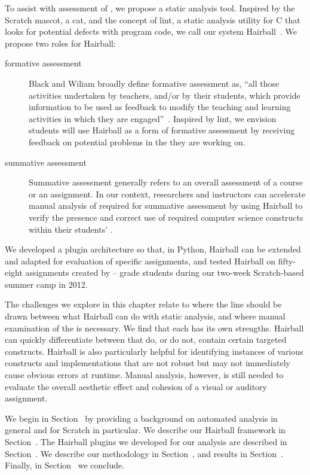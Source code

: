 To assist with assessment of , we propose a static analysis tool.
Inspired by the Scratch mascot, a cat, and the concept of lint, a static
analysis utility for C that looks for potential defects with program code, we
call our system Hairball~\cite{Johnson78lint}. We propose two roles for
Hairball:

\begin{description}
\item[formative assessment] Black and Wiliam broadly define formative
  assessment as, ``all those activities undertaken by teachers, and/or by their
  students, which provide information to be used as feedback to modify the
  teaching and learning activities in which they are
  engaged''~\cite{black1998assessment}. Inspired by lint, we envision students
  will use Hairball as a form of formative assessment by receiving feedback on
  potential problems in the  they are working on.
\item[summative assessment] Summative assessment generally refers to an overall
  assessment of a course or an assignment. In our context, researchers and
  instructors can accelerate manual analysis of  required for
  summative assessment by using Hairball to verify the presence and correct use
  of required computer science constructs within their students' .
\end{description}

We developed a plugin architecture so that, in Python, Hairball can be extended
and adapted for evaluation of specific assignments, and tested Hairball on
fifty-eight assignments created by -- grade students during our
two-week Scratch-based summer camp in 2012.

The challenges we explore in this chapter relate to where the line should be
drawn between what Hairball can do with static analysis, and where manual
examination of the \sprogram{} is necessary.  We find that each has its own
strengths.  Hairball can quickly differentiate between  that do, or
do not, contain certain targeted constructs. Hairball is also particularly
helpful for identifying instances of various constructs and implementations
that are not robust but may not immediately cause obvious errors at runtime.
Manual analysis, however, is still needed to evaluate the overall aesthetic
effect and cohesion of a visual or auditory assignment.

We begin in Section~ by providing a background on
automated analysis in general and for Scratch in particular. We describe our
Hairball framework in Section~. The Hairball plugins we
developed for our analysis are described in Section~. We
describe our methodology in Section~, and results in
Section~. Finally, in Section~ we
conclude.
